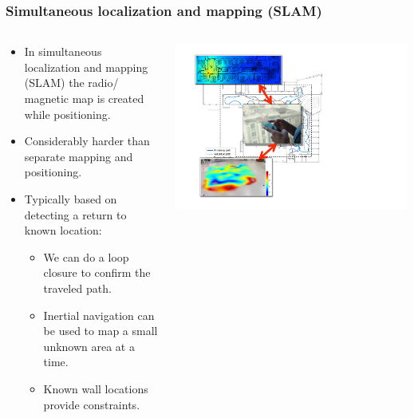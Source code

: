 \documentclass[xcolor=svgnames,english,presentation]{beamer}
\begin{document}
\begin{frame}
  \frametitle{Simultaneous localization and mapping (SLAM)}

  \begin{columns}
  \begin{column}{0.5\textwidth}
  \begin{itemize}[<+->]       
  \item In \alert{simultaneous localization and mapping (SLAM)} the radio/ magnetic
  map is created while positioning.
  \item Considerably \alert{harder} than \alert{separate mapping and positioning}.
  \item Typically based on detecting a \alert{return to known location}:
  \begin{itemize}[<+->]       
  \item We can do a \alert{loop closure} to confirm the traveled path.
  \item \alert{Inertial navigation} can be used to map a small unknown area at a time.
  \item Known wall locations provide \alert{constraints}.
  \end{itemize}
  \end{itemize}
  \end{column}
  \begin{column}{0.5\textwidth}
  \includegraphics[width=\columnwidth]{slam} \\
  \end{column}
  \end{columns}
\end{frame}
\end{document}
